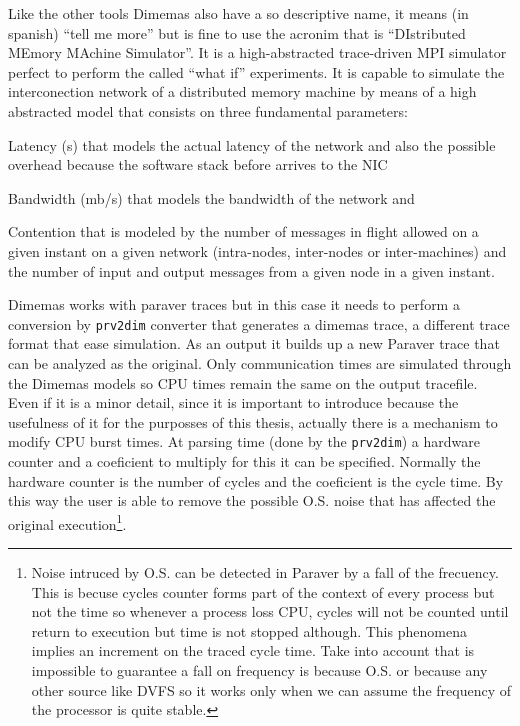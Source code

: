 Like the other tools Dimemas also have a so descriptive name, it means (in
spanish) ``tell me more'' but is fine to use the acronim that is ``DIstributed
MEmory MAchine Simulator''. It is a high-abstracted trace-driven MPI simulator
perfect to perform the called ``what if'' experiments. It is capable to simulate
the interconection network of a distributed memory machine by means of a high
abstracted model that consists on three fundamental parameters:
\begin{enumerate*}[label=\roman*)]
  \item Latency (s) that models the actual latency of the network and also the
    possible overhead because the software stack before arrives to the NIC
  \item Bandwidth (mb/s) that models the bandwidth of the network and
  \item Contention that is modeled by the number of messages in flight 
    allowed on a given instant on a given network (intra-nodes, inter-nodes or
    inter-machines) and the number of input and output messages from a given
    node in a given instant.
\end{enumerate*}

Dimemas works with paraver traces but in this case it needs to perform a 
conversion by {\tt prv2dim} converter that generates a dimemas trace, a
different trace format that ease simulation.
As an output it builds up a
new Paraver trace that can be analyzed as the original. Only communication times 
are simulated through the Dimemas models so CPU times
remain the same on the output tracefile. Even if it is a minor detail, since it
is important to introduce because the usefulness of it for the purposses of this
thesis, actually there is a mechanism to modify CPU burst times. At parsing time
(done by the {\tt prv2dim}) a hardware counter and a coeficient to multiply 
for this it can be specified. Normally the hardware counter is the number of 
cycles and the coeficient is the cycle time. By this way the user is able to 
remove the possible O.S. noise that has affected the original
execution\footnote{Noise intruced by O.S. can be detected in Paraver by a fall 
  of the frecuency. This is becuse cycles counter forms part of the context of
  every process but not the time so whenever a process loss CPU, cycles will not
  be counted until return to execution but time is not stopped although. This
  phenomena implies an increment on the traced cycle time. Take into account
  that is impossible to guarantee a fall on frequency is because O.S. or because
  any other source like DVFS so it works only when we can assume the frequency
of the processor is quite stable.}.

